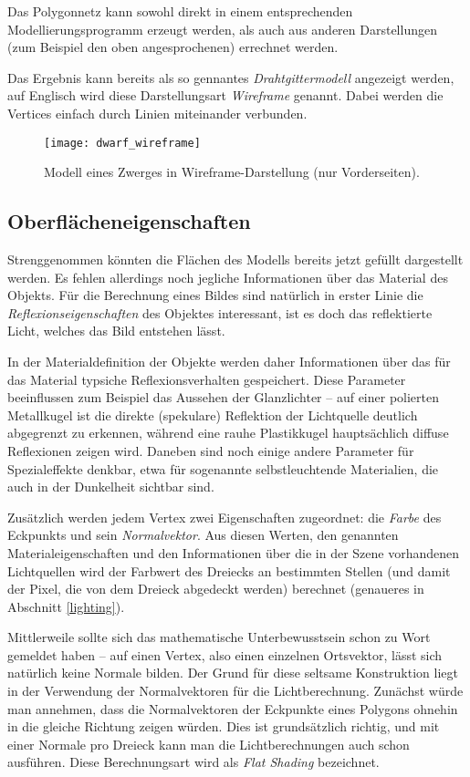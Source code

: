 Das Polygonnetz kann sowohl direkt in einem entsprechenden Modellierungsprogramm erzeugt werden, als auch aus anderen Darstellungen (zum Beispiel den oben angesprochenen) errechnet werden.

Das Ergebnis kann bereits als so gennantes \emph{Drahtgittermodell} angezeigt werden, auf Englisch wird diese Darstellungsart \emph{Wireframe} genannt. Dabei werden die Vertices einfach durch Linien miteinander verbunden.

\begin{wrapfigure}{R}{0.4\textwidth}
  \vspace{-10pt}
  \texttt{[image: dwarf\_wireframe]}
  \vspace{-10pt}
  \caption{Modell eines Zwerges in Wireframe-Darstellung (nur Vorderseiten).}
\end{wrapfigure}

\subsection{Oberflächeneigenschaften}
Strenggenommen könnten die Flächen des Modells bereits jetzt gefüllt dargestellt werden. Es fehlen allerdings noch jegliche Informationen über das Material des Objekts. Für die Berechnung eines Bildes sind natürlich in erster Linie die \emph{Reflexionseigenschaften} des Objektes interessant, ist es doch das reflektierte Licht, welches das Bild entstehen lässt.

In der Materialdefinition der Objekte werden daher Informationen über das für das Material typsiche Reflexionsverhalten gespeichert. Diese Parameter beeinflussen zum Beispiel das Aussehen der Glanzlichter -- auf einer polierten Metallkugel ist die direkte (spekulare) Reflektion der Lichtquelle deutlich abgegrenzt zu erkennen, während eine rauhe Plastikkugel hauptsächlich diffuse Reflexionen zeigen wird. Daneben sind noch einige andere Parameter für Spezialeffekte denkbar, etwa für sogenannte selbstleuchtende Materialien, die auch in der Dunkelheit sichtbar sind.

Zusätzlich werden jedem Vertex zwei Eigenschaften zugeordnet: die \emph{Farbe} des Eckpunkts und sein \emph{Normalvektor}. Aus diesen Werten, den genannten Materialeigenschaften und den Informationen über die in der Szene vorhandenen Lichtquellen wird der Farbwert des Dreiecks an bestimmten Stellen (und damit der Pixel, die von dem Dreieck abgedeckt werden) berechnet (genaueres in Abschnitt \ref{lighting}).

\label{vertexnormals}
Mittlerweile sollte sich das mathematische Unterbewusstsein schon zu Wort gemeldet haben -- auf einen Vertex, also einen 
einzelnen Ortsvektor, lässt sich natürlich keine Normale bilden. Der Grund für diese seltsame Konstruktion liegt in der Verwendung der Normalvektoren für die Lichtberechnung. Zunächst würde man annehmen, dass die Normalvektoren der Eckpunkte eines Polygons ohnehin in die gleiche Richtung zeigen würden. Dies ist grundsätzlich richtig, und mit einer Normale pro Dreieck kann man die Lichtberechnungen auch schon ausführen. Diese Berechnungsart wird als \emph{Flat Shading} bezeichnet.

